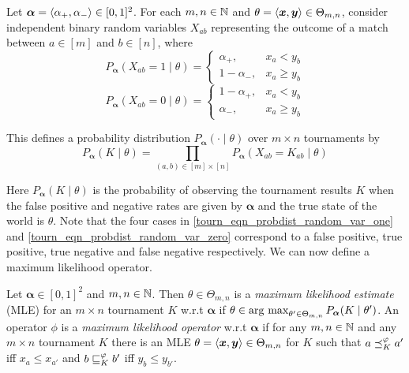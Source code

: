 \begin{definition}
   \label{tourn_def_probdist}

   Let $\bm{\alpha} = \langle {\alpha_+, \alpha_-} \rangle \in [0,1]^2$. For each $m,
   n \in \mathbb{N}$ and $\theta = \langle {\bm{x}, \bm{y}} \rangle \in \Theta_{m,n}$, consider
   independent binary random variables $X_{ab}$ representing the outcome of a
   match between $a \in [m]$ and $b \in [n]$, where
   \begin{equation}
        \label{tourn_eqn_probdist_random_var_one}
        P_{\bm{\alpha}}(X_{ab} = 1 \mid \theta)
        = \begin{cases}
            \alpha_+,& x_a < y_b \\
            1 - \alpha_-,& x_a \ge y_b
        \end{cases}
   \end{equation}
   \begin{equation}
        \label{tourn_eqn_probdist_random_var_zero}
        P_{\bm{\alpha}}(X_{ab} = 0 \mid \theta)
        = \begin{cases}
            1 - \alpha_+,& x_a < y_b \\
            \alpha_-,& x_a \ge y_b
        \end{cases}
   \end{equation}

   This defines a probability distribution $P_{\bm{\alpha}}({\cdot} \mid
   \theta)$ over $m \times n$ tournaments by
   \[
      P_{\bm{\alpha}}(K \mid \theta) = \prod_{(a, b) \in [m] \times [n]}{
           P_{\bm{\alpha}}(X_{ab} = K_{ab} \mid \theta)
      }
   \]
\end{definition}

Here $P_{\bm{\alpha}}(K \mid \theta)$ is the probability of observing the
tournament results $K$ when the false positive and negative rates are given by
$\bm{\alpha}$ and the true state of the world is $\theta$. Note that the
four cases in \cref{tourn_eqn_probdist_random_var_one} and
\cref{tourn_eqn_probdist_random_var_zero} correspond to a false positive, true
positive, true negative and false negative respectively. We can now define a
maximum likelihood operator.

\begin{definition}

    Let $\bm{\alpha} \in [0,1]^2$ and $m, n \in \mathbb{N}$. Then $\theta \in
    \Theta_{m,n}$ is a \emph{maximum likelihood estimate} (MLE) for an $m
    \times n$ tournament $K$ w.r.t $\bm{\alpha}$ if $\theta \in
    \operatorname*{arg\ max}_{\theta' \in \Theta_{m,n}}{P_{\bm{\alpha}}(K \mid \theta')}$. An
    operator $\phi$ is a \emph{maximum likelihood operator} w.r.t
    $\bm{\alpha}$ if for any $m, n \in \mathbb{N}$ and any $m \times n$ tournament $K$
    there is an MLE $\theta = \langle {\bm{x}, \bm{y}} \rangle \in \Theta_{m,n}$ for $K$
    such that $a \preceq_K^\varphi a'$ iff $x_a \le x_{a'}$ and $b \sqsubseteq_K^\varphi b'$
    iff $y_b \le y_{b'}$.

\end{definition}

